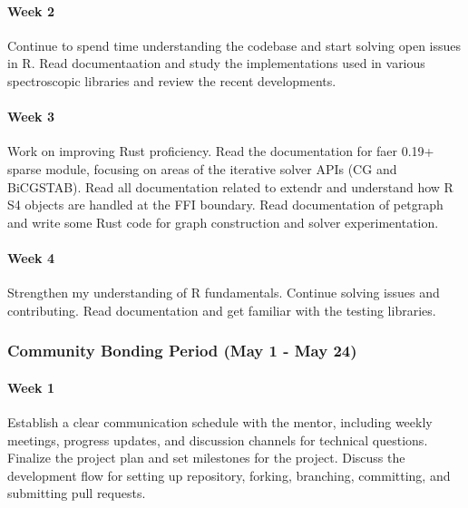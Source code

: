 \documentclass[11pt]{article}
\begin{document}
\hypertarget{week-2}{%
\paragraph{Week 2}\label{week-2}}

\hfill\break
Continue to spend time understanding the codebase and start solving open
issues in R. Read documentaation and study the implementations used in
various spectroscopic libraries and review the recent developments.

\hypertarget{week-3}{%
\paragraph{Week 3}\label{week-3}}

\hfill\break
Work on improving Rust proficiency. Read the documentation for faer
0.19+ sparse module, focusing on areas of the iterative solver APIs (CG
and BiCGSTAB). Read all documentation related to extendr and understand
how R S4 objects are handled at the FFI boundary. Read documentation of
petgraph and write some Rust code for graph construction and solver
experimentation.

\hypertarget{week-4}{%
\paragraph{Week 4}\label{week-4}}

\hfill\break
Strengthen my understanding of R fundamentals. Continue solving issues
and contributing. Read documentation and get familiar with the testing
libraries.

\hypertarget{community-bonding-period-may-1---may-24}{%
\subsubsection{Community Bonding Period (May 1 - May
24)}\label{community-bonding-period-may-1---may-24}}

\hypertarget{week-1-1}{%
\paragraph{Week 1}\label{week-1-1}}

\hfill\break
Establish a clear communication schedule with the mentor, including
weekly meetings, progress updates, and discussion channels for technical
questions. Finalize the project plan and set milestones for the project.
Discuss the development flow for setting up repository, forking,
branching, committing, and submitting pull requests.
\end{document}
